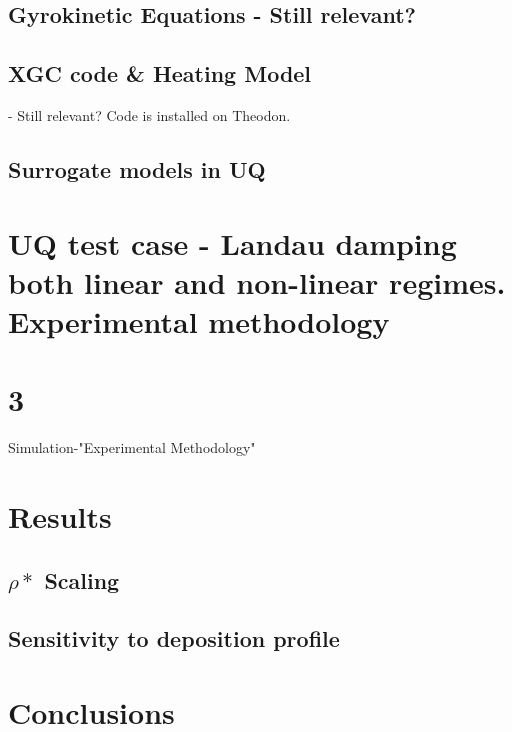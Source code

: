 \documentclass{article}
\begin{document}
 \subsection{Gyrokinetic Equations - Still relevant?}
\subsection{ XGC code \& Heating Model}
 - Still relevant? Code is installed on Theodon.
 \subsection{Surrogate models in UQ}
\section{UQ test case - Landau damping both linear and non-linear regimes. Experimental methodology}
\section{3}
Simulation-"Experimental Methodology"
\section{Results}
\subsection{$\rho*$ Scaling}
\subsection{Sensitivity to deposition profile}
\section{Conclusions}
\end{document}

